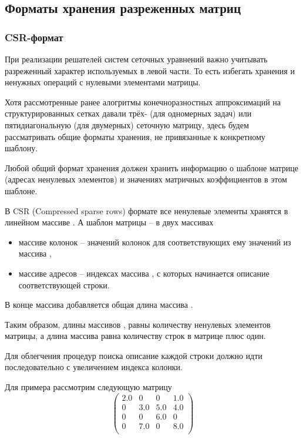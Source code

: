 \subsection{Форматы хранения разреженных матриц}
\label{sec:sparse-matrix}
\subsubsection{CSR-формат}
\label{sec:csr}
При реализации решателей систем сеточных уравнений важно учитывать
разреженный характер используемых в левой части. То есть избегать
хранения и ненужных операций с нулевыми элементами матрицы.

Хотя рассмотренные ранее алогритмы конечноразностных аппроксимаций на структурированных сетках
давали трёх- (для одномерных задач) или пятидиагональную (для двумерных) сеточную матрицу,
здесь будем рассматривать общие форматы хранения, не привязанные к конкретному шаблону.

Любой общий
формат хранения должен хранить
информацию о шаблоне матрице (адресах ненулевых элементов)
и значениях матричных коэффициентов в этом шаблоне.

В CSR (Compressed sparse rows) формате
все ненулевые элементы хранятся в линейном массиве .
А шаблон матрицы -- в двух массивах
\begin{itemize}
	\item массиве колонок  -- значений колонок для соответствующих ему значений из массива ,
	\item массиве адресов  -- индексах массива , с которых начинается описание соответствующей строки.
\end{itemize}
В конце массива  добавляется общая длина массива .

Таким образом, длины массивов ,  равны количеству ненулевых элементов матрицы,
а длина массива  равна количеству строк в матрице плюс один.

Для облегчения процедур поиска описание каждой строки должно идти последовательно
с увеличением индекса колонки.

Для примера рассмотрим следующую матрицу
\begin{equation}
\label{eq:example-sparse-matrix}
\left(
\begin{array}{cccc}
2.0 & 0 & 0 & 1.0 \\
0 & 3.0 & 5.0 & 4.0 \\
0 & 0 & 6.0 & 0 \\
0 & 7.0 & 0 & 8.0 \\
\end{array}
\right)
\end{equation}


